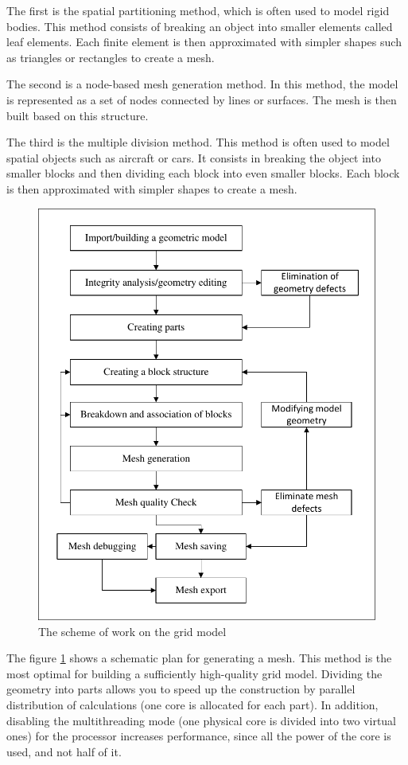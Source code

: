 	The first is the spatial partitioning method, which is often used to model rigid bodies. This method consists of breaking an object into smaller elements called leaf elements. Each finite element is then approximated with simpler shapes such as triangles or rectangles to create a mesh.
	
	The second is a node-based mesh generation method. In this method, the model is represented as a set of nodes connected by lines or surfaces. The mesh is then built based on this structure.
	
	The third is the multiple division method. This method is often used to model spatial objects such as aircraft or cars. It consists in breaking the object into smaller blocks and then dividing each block into even smaller blocks. Each block is then approximated with simpler shapes to create a mesh.
	\begin{figure}[H]
		\centering
		\includegraphics[width=0.7\linewidth]{../Assets/СхемаСозданияСеткиEN}
		\caption{\footnotesize{The scheme of work on the grid model}}
		\label{fig:meshScheme}
	\end{figure}
	The figure \ref{fig:meshScheme} shows a schematic plan for generating a mesh. This method is the most optimal for building a sufficiently high-quality grid model. Dividing the geometry into parts allows you to speed up the construction by parallel distribution of calculations (one core is allocated for each part). In addition, disabling the multithreading mode (one physical core is divided into two virtual ones) for the processor increases performance, since all the power of the core is used, and not half of it.
	
